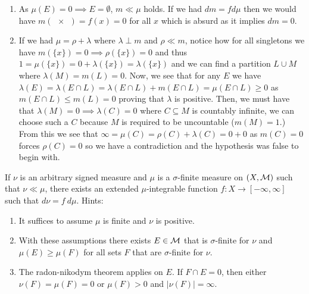 \documentclass[12pt,a4paper]{article}
\begin{document}
\begin{solution}
\begin{enumerate}[label=\alph*.]
	\item As $\mu(E)=0\implies E=\emptyset$, $m\ll\mu$ holds. 
		If we had $dm=fd\mu$ then we would have $m( \qty{x})=f(x)=0$ for all $x$ which is absurd as it implies $dm=0$. 
    \item If we had $\mu=\rho+\lambda$ where $\lambda\perp m$ and $\rho\ll m$, notice how for all singletons we have $m(\{x\})=0\implies\rho(\{x\})=0$ and thus $1=\mu(\{x\})=0+\lambda(\{x\})=\lambda(\{x\})$ and we can find a partition $L\cup M$ where $\lambda(M)=m(L)=0$. 
        Now, we see that for any $E$ we have $\lambda(E)=\lambda(E\cap L)=\lambda(E\cap L)+m(E\cap L)=\mu(E\cap L)\geq 0$ as $m(E\cap L)\leq m(L)=0$ proving that $\lambda$ is positive.        Then, we must have that $\lambda(M)=0\implies\lambda(C)=0$ where $C\subseteq M$ is countably infinite, we can choose such a $C$ because $M$ is required to be uncountable ($m(M)=1$.) 
        From this we see that $\infty=\mu(C)=\rho(C)+\lambda(C)=0+0$ as $m(C)=0$ forces $\rho(C)=0$ so we have a contradiction and the hypothesis was false to begin with. 
\end{enumerate}
\end{solution}
\begin{problem}\label{prob:3-14}
If $\nu$ is an arbitrary signed measure and $\mu$ is a $\sigma$-finite measure on $(X, \mathcal{M})$ such that $\nu\ll\mu$, there exists an extended $\mu$-integrable function $f:X\rightarrow[-\infty,\infty]$ such that $d\nu=f~d\mu$. Hints:
\begin{enumerate}[label=\alph*.]
	\item It suffices to assume $\mu$ is finite and $\nu$ is positive.
	\item With these assumptions there exists $E\in\mathcal{M}$ that is $\sigma$-finite for $\nu$ and $\mu(E)\geq\mu(F)$ for all sets $F$ that are $\sigma$-finite for $\nu$.
	\item The radon-nikodym theorem applies on $E$. If $F\cap E=0$, then either $\nu(F)=\mu(F)=0$ or $\mu(F)>0$ and $|\nu(F)|=\infty$.
\end{enumerate}
\end{problem}
\end{document}

